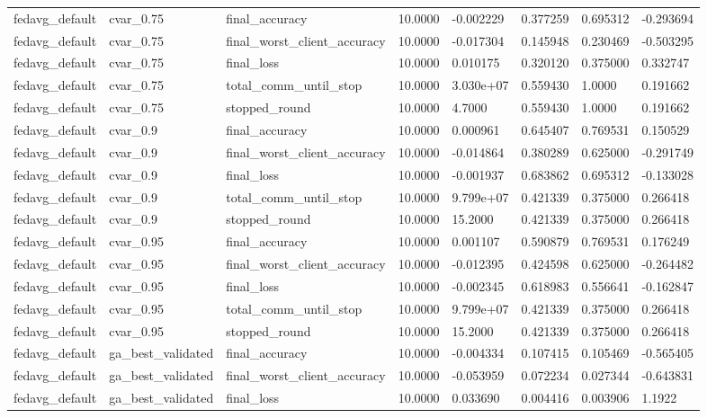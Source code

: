 \documentclass[11pt]{report}
\begin{document}
\begin{longtable}{llllllll}
fedavg\_default & cvar\_0.75 & final\_accuracy & 10.0000 & -0.002229 & 0.377259 & 0.695312 & -0.293694 \\
fedavg\_default & cvar\_0.75 & final\_worst\_client\_accuracy & 10.0000 & -0.017304 & 0.145948 & 0.230469 & -0.503295 \\
fedavg\_default & cvar\_0.75 & final\_loss & 10.0000 & 0.010175 & 0.320120 & 0.375000 & 0.332747 \\
fedavg\_default & cvar\_0.75 & total\_comm\_until\_stop & 10.0000 & 3.030e+07 & 0.559430 & 1.0000 & 0.191662 \\
fedavg\_default & cvar\_0.75 & stopped\_round & 10.0000 & 4.7000 & 0.559430 & 1.0000 & 0.191662 \\
fedavg\_default & cvar\_0.9 & final\_accuracy & 10.0000 & 0.000961 & 0.645407 & 0.769531 & 0.150529 \\
fedavg\_default & cvar\_0.9 & final\_worst\_client\_accuracy & 10.0000 & -0.014864 & 0.380289 & 0.625000 & -0.291749 \\
fedavg\_default & cvar\_0.9 & final\_loss & 10.0000 & -0.001937 & 0.683862 & 0.695312 & -0.133028 \\
fedavg\_default & cvar\_0.9 & total\_comm\_until\_stop & 10.0000 & 9.799e+07 & 0.421339 & 0.375000 & 0.266418 \\
fedavg\_default & cvar\_0.9 & stopped\_round & 10.0000 & 15.2000 & 0.421339 & 0.375000 & 0.266418 \\
fedavg\_default & cvar\_0.95 & final\_accuracy & 10.0000 & 0.001107 & 0.590879 & 0.769531 & 0.176249 \\
fedavg\_default & cvar\_0.95 & final\_worst\_client\_accuracy & 10.0000 & -0.012395 & 0.424598 & 0.625000 & -0.264482 \\
fedavg\_default & cvar\_0.95 & final\_loss & 10.0000 & -0.002345 & 0.618983 & 0.556641 & -0.162847 \\
fedavg\_default & cvar\_0.95 & total\_comm\_until\_stop & 10.0000 & 9.799e+07 & 0.421339 & 0.375000 & 0.266418 \\
fedavg\_default & cvar\_0.95 & stopped\_round & 10.0000 & 15.2000 & 0.421339 & 0.375000 & 0.266418 \\
fedavg\_default & ga\_best\_validated & final\_accuracy & 10.0000 & -0.004334 & 0.107415 & 0.105469 & -0.565405 \\
fedavg\_default & ga\_best\_validated & final\_worst\_client\_accuracy & 10.0000 & -0.053959 & 0.072234 & 0.027344 & -0.643831 \\
fedavg\_default & ga\_best\_validated & final\_loss & 10.0000 & 0.033690 & 0.004416 & 0.003906 & 1.1922 \\

\end{longtable}
\end{document}
